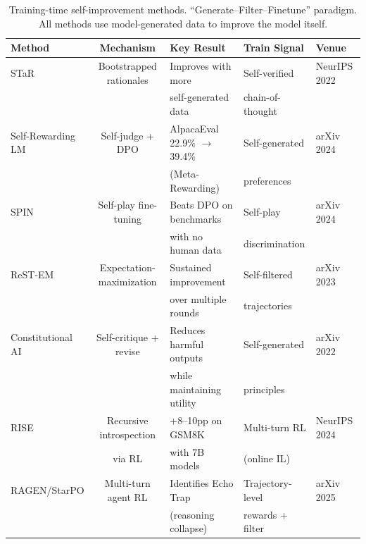 \begin{table}[t]
\centering
\caption{Training-time self-improvement methods. ``Generate--Filter--Finetune'' paradigm. All methods use model-generated data to improve the model itself.}
\label{tab:bench-training}
\begin{tabular}{@{}lclll@{}}
\toprule
\textbf{Method} & \textbf{Mechanism} & \textbf{Key Result} & \textbf{Train Signal} & \textbf{Venue} \\
\midrule
STaR & Bootstrapped rationales & Improves with more & Self-verified & NeurIPS 2022 \\
 & & self-generated data & chain-of-thought & \\
Self-Rewarding LM & Self-judge + DPO & AlpacaEval 22.9\% $\to$ 39.4\% & Self-generated & arXiv 2024 \\
 & & (Meta-Rewarding) & preferences & \\
SPIN & Self-play fine-tuning & Beats DPO on benchmarks & Self-play & arXiv 2024 \\
 & & with no human data & discrimination & \\
ReST-EM & Expectation-maximization & Sustained improvement & Self-filtered & arXiv 2023 \\
 & & over multiple rounds & trajectories & \\
Constitutional AI & Self-critique + revise & Reduces harmful outputs & Self-generated & arXiv 2022 \\
 & & while maintaining utility & principles & \\
RISE & Recursive introspection & +8--10pp on GSM8K & Multi-turn RL & NeurIPS 2024 \\
 & via RL & with 7B models & (online IL) & \\
RAGEN/StarPO & Multi-turn agent RL & Identifies Echo Trap & Trajectory-level & arXiv 2025 \\
 & & (reasoning collapse) & rewards + filter & \\
\bottomrule
\end{tabular}
\end{table}

